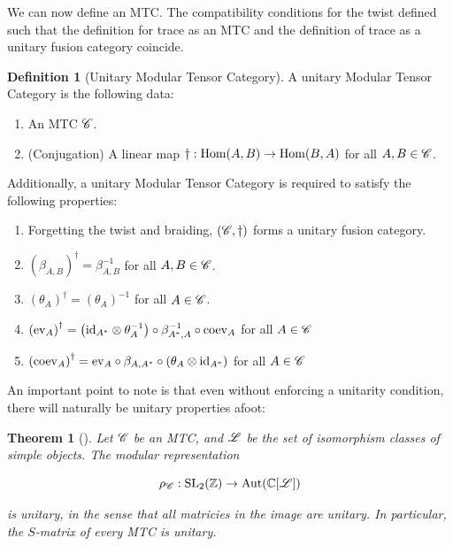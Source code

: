 \documentclass{article}
\newtheorem{theorem}{Theorem}[section]
\theoremstyle{definition}
\newtheorem*{definition}{Definition}
\numberwithin{figure}{section}
\begin{document}
We can now define an MTC. The compatibility conditions for the twist defined such that the definition for trace as an MTC and the definition of trace as a unitary fusion category coincide.

\begin{definition}[Unitary Modular Tensor Category] A unitary Modular Tensor Category is the following data:

\begin{enumerate}
\item An MTC $\mathscr{C}$.
\item (Conjugation) A linear map $\dagger: \mathrm{Hom}(A,B)\to \mathrm{Hom}(B,A)$ for all $A,B\in \mathscr{C}$.
\end{enumerate}

Additionally, a unitary Modular Tensor Category is required to satisfy the following properties:

\begin{enumerate}
\item Forgetting the twist and braiding, $\left(\mathscr{C},\dagger\right)$ forms a unitary fusion category.
\item $\left(\beta_{A,B}\right)^{\dagger}=\beta_{A,B}^{-1}$ for all $A,B\in \mathscr{C}$.
\item $\left(\theta_A\right)^{\dagger}=\left(\theta_A\right)^{-1}$ for all $A\in \mathscr{C}$.
\item $\left(\mathrm{ev}_{A}\right)^{\dagger}= \left(\mathrm{id}_{A^*}\otimes \theta_A^{-1}\right)\circ \beta_{A^*,A}^{-1}\circ \mathrm{coev}_A$ for all $A\in \mathscr{C}$
\item $\left(\mathrm{coev}_{A}\right)^{\dagger}= \mathrm{ev}_{A}\circ\beta_{A,A^*}\circ\left(\theta_A \otimes \mathrm{id}_{A^*}\right)$ for all $A\in \mathscr{C}$
\end{enumerate}

\raggedleft\qedsymbol{}
\end{definition}

An important point to note is that even without enforcing a unitarity condition, there will naturally be unitary properties afoot:

\begin{theorem}[\cite{etingof2005fusion}] Let $\mathscr{C}$ be an MTC, and $\mathscr{L}$ be the set of isomorphism classes of simple objects. The modular representation

$$\rho_{\mathscr{C}}:\mathrm{SL}_2(\mathbb{Z})\to \mathrm{Aut}(\mathbb{C}[\mathscr{L}])$$

is unitary, in the sense that all matricies in the image are unitary. In particular, the $S$-matrix of every MTC is unitary.
\end{theorem}
\end{document}
